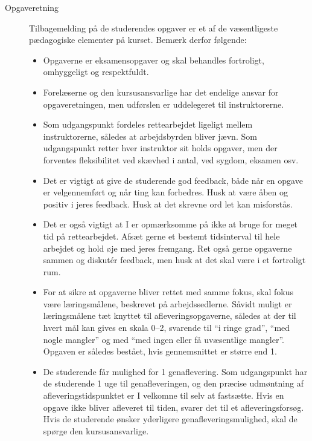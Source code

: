 \documentclass[a4paper]{article}
\begin{document}
\begin{description}
\item[Opgaveretning] Tilbagemelding på de studerendes opgaver er et
  af de væsentligeste pædagogiske elementer på kurset. Bemærk derfor
  følgende:
  \begin{itemize}
  \item Opgaverne er eksamensopgaver og skal behandles fortroligt,
    omhyggeligt og respektfuldt.
  \item Forelæserne og den kursusansvarlige har det endelige ansvar for
    opgaveretningen, men udførslen er uddelegeret til instruktorerne.
  \item Som udgangspunkt fordeles rettearbejdet ligeligt mellem
    instruktorerne, således at arbejdsbyrden bliver jævn. Som
    udgangspunkt retter hver instruktor sit holds opgaver, men der
    forventes fleksibilitet ved skævhed i antal, ved sygdom, eksamen
    osv.
  \item Det er vigtigt at give de studerende god feedback, både når en
    opgave er velgennemført og når ting kan forbedres. Husk at være
    åben og positiv i jeres feedback. Husk at det skrevne ord let kan
    misforstås.
  \item Det er også vigtigt at I er opmærksomme på ikke at bruge for
    meget tid på rettearbejdet. Afsæt gerne et bestemt tidsinterval
    til hele arbejdet og hold øje med jeres fremgang. Ret også gerne
    opgaverne sammen og diskut\'{e}r feedback, men husk at det skal være
    i et fortroligt rum.
  \item For at sikre at opgaverne bliver rettet med samme fokus, skal
    fokus være læringsmålene, beskrevet på arbejdssedlerne. Såvidt
    muligt er læringsmålene tæt knyttet til afleveringsopgaverne,
    således at der til hvert mål kan gives en skala 0--2, svarende til
    "`i ringe grad"', "`med nogle mangler"' og med "`med ingen eller
    få uvæsentlige mangler"'. Opgaven er således bestået, hvis
    gennemsnittet er større end 1.
  \item De studerende får mulighed for 1 genaflevering. Som
    udgangspunkt har de studerende 1 uge til genafleveringen, og den
    præcise udmøntning af afleveringstidspunktet er I velkomne til
    selv at fastsætte. Hvis en opgave ikke bliver afleveret til tiden,
    svarer det til et afleveringsforsøg. Hvis de studerende ønsker
    yderligere genafleveringsmulighed, skal de spørge
    den kursusansvarlige.
  \end{itemize}



\end{description}
\end{document}

